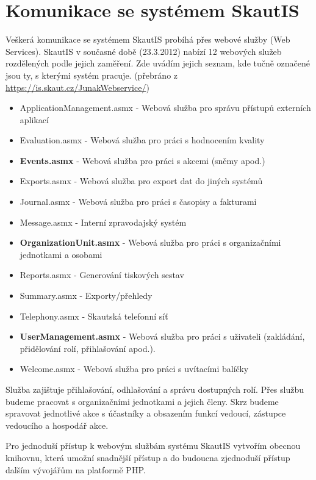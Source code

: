\documentclass[thesis=B,czech]{FITthesis}[2011/06/14]
\begin{document}
\section{Komunikace se systémem SkautIS}\label{sec:skautisComunication}
Veškerá komunikace se systémem SkautIS probíhá přes webové služby (Web Services). SkautIS v současné době (23.3.2012) nabízí 12 webových služeb rozdělených podle jejich zaměření. Zde uvádím jejich seznam, kde tučně označené jsou ty, s kterými systém pracuje. (přebráno z \url{https://is.skaut.cz/JunakWebservice/})
\begin{itemize}
	\item ApplicationManagement.asmx - Webová služba pro správu přístupů externích aplikací
	\item Evaluation.asmx - Webová služba pro práci s hodnocením kvality
	\item \textbf{Events.asmx} - Webová služba pro práci s akcemi (sněmy apod.)
	\item Exports.asmx - Webová služba pro export dat do jiných systémů
	\item Journal.asmx - Webová služba pro práci s časopisy a fakturami
	\item Message.asmx - Interní zpravodajský systém
	\item \textbf{OrganizationUnit.asmx} - Webová služba pro práci s organizačními jednotkami a osobami
	\item Reports.asmx - Generování tiskových sestav
	\item Summary.asmx - Exporty/přehledy
	\item Telephony.asmx - Skautská telefonní síť
	\item \textbf{UserManagement.asmx} - Webová služba pro práci s uživateli (zakládání, přidělování rolí, přihlašování apod.).
	\item Welcome.asmx - Webová služba pro práci s uvítacími balíčky
\end{itemize}

Služba  zajištuje přihlašování, odhlašování a správu dostupných rolí. Přes službu  budeme pracovat s organizačními jednotkami a jejich členy. Skrz  budeme spravovat jednotlivé akce s účastníky a obsazením funkcí vedoucí, zástupce vedoucího a hospodář akce.

Pro jednoduší přístup k webovým službám systému SkautIS vytvořím obecnou knihovnu, která umožní snadnější přístup a do budoucna zjednoduší přístup dalším vývojářům na platformě PHP.
\end{document}
